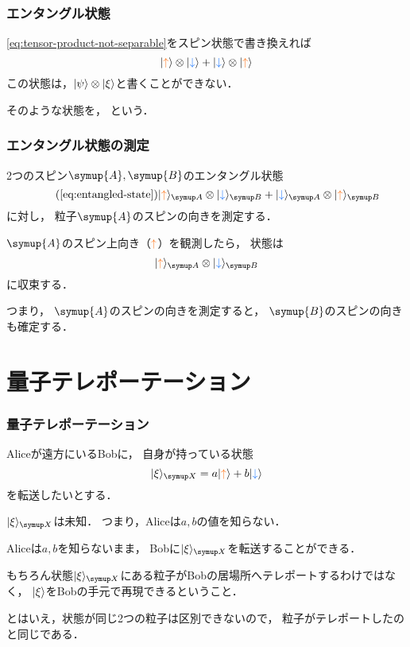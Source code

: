\documentclass[
    10pt,
    ]{sotsu-beamer}
\newcommand{\bitone}{\mathcolor{fire}{\uparrow}}
\newcommand{\bittwo}{\mathcolor{water}{\downarrow}}
\begin{document}
\begin{frame}
    \frametitle{エンタングル状態}
    
    \eqref{eq:tensor-product-not-separable}をスピン状態で書き換えれば
    \begin{equation}
        \label{eq:entangled-state}
        \ket{\bitone} \otimes \ket{\bittwo}
        + \ket{\bittwo} \otimes \ket{\bitone}
    \end{equation}
    この状態は，$\ket{\psi} \otimes \ket{\xi}$と書くことができない．

    そのような状態を，
    という．
    
\end{frame}


\begin{frame}
    \frametitle{エンタングル状態の測定}

    2つのスピン$\symup{A}, \symup{B}$のエンタングル状態
    \begin{equation*}
        \tag{\ref*{eq:entangled-state}}
        \ket{\bitone}<A> \otimes \ket{\bittwo}<B>
        + \ket{\bittwo}<A> \otimes \ket{\bitone}<B>
    \end{equation*}
    に対し，
    粒子$\symup{A}$のスピンの向きを測定する．

    \pause

    $\symup{A}$のスピン上向き（$\bitone$）を観測したら，
    状態は
    \begin{equation*}
        \ket{\bitone}<A> \otimes \ket{\bittwo}<B>
    \end{equation*}
    に収束する．

    つまり，
    \alert{$\symup{A}$のスピンの向きを測定すると，
    $\symup{B}$のスピンの向きも確定する．}

\end{frame}


\section{量子テレポーテーション}


\begin{frame}
    \frametitle{量子テレポーテーション}

    Aliceが遠方にいるBobに，
    自身が持っている状態
    \begin{equation*}
        \ket{\xi}<X> = a \ket{\bitone} + b \ket{\bittwo}
    \end{equation*}
    を転送したいとする．

    \alert{$\ket{\xi}<X>$は未知．}
    つまり，Aliceは$a, b$の値を知らない．

    \pause

    Aliceは$a, b$を知らないまま，
    Bobに$\ket{\xi}<X>$を転送することができる．

    もちろん状態$\ket{\xi}<X>$にある粒子がBobの居場所へテレポートするわけではなく，
    $\ket{\xi}$をBobの手元で再現できるということ．

    {\small
        とはいえ，状態が同じ2つの粒子は区別できないので，
        粒子がテレポートしたのと同じである．
    }

\end{frame}
\end{document}
